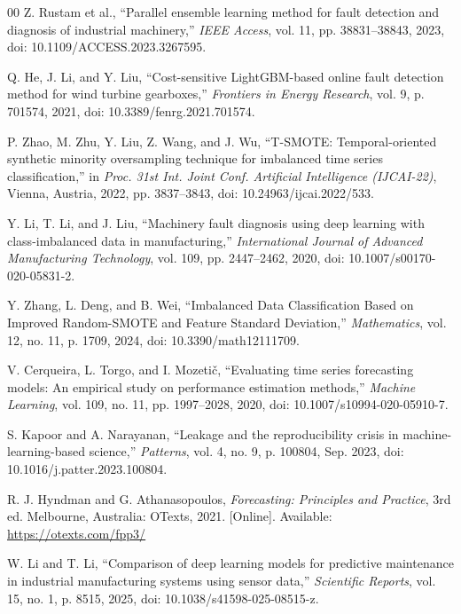 \documentclass[conference]{IEEEtran}
\begin{document}
\begin{thebibliography}{00}
Z. Rustam et al., ``Parallel ensemble learning method for fault detection and diagnosis of industrial machinery,'' \textit{IEEE Access}, vol. 11, pp. 38831--38843, 2023, doi: 10.1109/ACCESS.2023.3267595.

Q. He, J. Li, and Y. Liu, ``Cost-sensitive LightGBM-based online fault detection method for wind turbine gearboxes,'' \textit{Frontiers in Energy Research}, vol. 9, p. 701574, 2021, doi: 10.3389/fenrg.2021.701574.

P. Zhao, M. Zhu, Y. Liu, Z. Wang, and J. Wu, ``T-SMOTE: Temporal-oriented synthetic minority oversampling technique for imbalanced time series classification,'' in \textit{Proc. 31st Int. Joint Conf. Artificial Intelligence (IJCAI-22)}, Vienna, Austria, 2022, pp. 3837--3843, doi: 10.24963/ijcai.2022/533.

Y. Li, T. Li, and J. Liu, ``Machinery fault diagnosis using deep learning with class-imbalanced data in manufacturing,'' \textit{International Journal of Advanced Manufacturing Technology}, vol. 109, pp. 2447--2462, 2020, doi: 10.1007/s00170-020-05831-2.

Y. Zhang, L. Deng, and B. Wei, ``Imbalanced Data Classification Based on Improved Random-SMOTE and Feature Standard Deviation,'' \textit{Mathematics}, vol. 12, no. 11, p. 1709, 2024, doi: 10.3390/math12111709.

V. Cerqueira, L. Torgo, and I. Mozetič, ``Evaluating time series forecasting models: An empirical study on performance estimation methods,'' \textit{Machine Learning}, vol. 109, no. 11, pp. 1997--2028, 2020, doi: 10.1007/s10994-020-05910-7.

S. Kapoor and A. Narayanan, ``Leakage and the reproducibility crisis in machine-learning-based science,'' \textit{Patterns}, vol. 4, no. 9, p. 100804, Sep. 2023, doi: 10.1016/j.patter.2023.100804.

R. J. Hyndman and G. Athanasopoulos, \textit{Forecasting: Principles and Practice}, 3rd ed. Melbourne, Australia: OTexts, 2021. [Online]. Available: \url{https://otexts.com/fpp3/}

W. Li and T. Li, ``Comparison of deep learning models for predictive maintenance in industrial manufacturing systems using sensor data,'' \textit{Scientific Reports}, vol. 15, no. 1, p. 8515, 2025, doi: 10.1038/s41598-025-08515-z.


\end{thebibliography}
\end{document}
